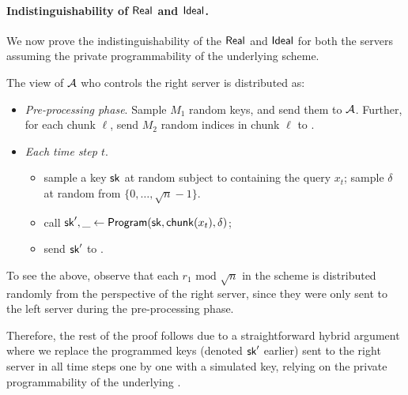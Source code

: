 \paragraph{Indistinguishability of ${\sf Real}$ and ${\sf Ideal}$.}
We now prove the indistinguishability of the ${\sf Real}$ and
${\sf Ideal}$ for both the servers
assuming the 
private programmability of the underlying \ppps scheme.
The view of $\mathcal{A}$ who controls the right server is 
distributed as: 
\begin{itemize}[leftmargin=5mm]
\item {\it Pre-processing phase}.
Sample $M_1$ random \ppps keys, and send them to $\mathcal{A}$. 
Further, for each chunk $\ell$, send $M_2$ random indices
in chunk $\ell$ to \algA.
\item {\it Each time step $t$}.
\begin{itemize}[leftmargin=5mm]
\item 
sample a \ppps key $\mathsf{sk}$
 at random subject to containing the query $x_t$;
sample $\delta$ at random
from $\{0, \ldots, \sqrt{n}-1\}$.
\item 
call $\mathsf{sk}', \_ \leftarrow {\sf Program}(\mathsf{sk}, \mathsf{chunk}(x_t), \delta)$; 
\item 
send $\mathsf{sk}'$ to \algA.
\end{itemize}
\end{itemize}
To see the above, observe that each 
$r_1\text{ mod }\sqrt{n}$ in the scheme 
is distributed randomly from the perspective
of the right server,  
since they 
were only sent to the 
left server during the pre-processing phase.

Therefore, the rest of the proof follows
due to a straightforward hybrid argument
where we replace
the programmed keys (denoted $\mathsf{sk}'$ earlier) 
sent to the right server in all time steps one by one
with a simulated key, 
relying on the private programmability of the underlying \ppps. 




